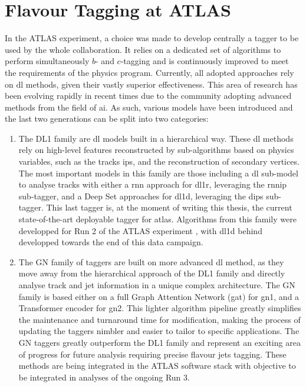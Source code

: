 \section{Flavour Tagging at ATLAS}
In the ATLAS experiment, a choice was made to develop centrally a tagger to be used by the whole collaboration. It relies on a dedicated set of algorithms to perform simultaneously $b$- and $c$-tagging and is continuously improved to meet the requirements of the physics program. Currently, all adopted approaches rely on \gls{dl} methods, given their vastly superior effectiveness. This area of research has been evolving rapidly in recent times due to the community adopting advanced methods from the field of \gls{ai}. As such, various models have been introduced and the last two generations can be split into two categories: 
\begin{enumerate}
  \item The DL1 family are \gls{dl} models built in a hierarchical way. These \gls{dl} methods rely on high-level features reconstructed by sub-algorithms based on physics variables, such as the tracks \glspl{ip}, and the reconstruction of secondary vertices. The most important models in this family are those including a \gls{dl} sub-model to analyse tracks with either a \gls{rnn} approach for \gls{dl1r}, leveraging the \gls{rnnip} sub-tagger, and a Deep Set approaches for \gls{dl1d}, leveraging the \gls{dips} sub-tagger. This last tagger is, at the moment of writing this thesis, the current state-of-the-art deployable tagger for \gls{atlas}. Algorithms from this family were developped for Run 2 of the ATLAS experiment \cite{atlas:FTAGRUN2}, with \gls{dl1d} behind developped towards the end of this data campaign.
  \item The GN family of taggers are built on more advanced \gls{dl} method, as they move away from the hierarchical approach of the DL1 family and directly analyse track and jet information in a unique complex architecture. The GN family is based either on a full Graph Attention Network (\gls{gat}) for \gls{gn1}, and a Transformer encoder for \gls{gn2}. This lighter algorithm pipeline greatly simplifies the maintenance and turnaround time for modification, making the process of updating the taggers nimbler and easier to tailor to specific applications. The GN taggers greatly outperform the DL1 family and represent an exciting area of progress for future analysis requiring precise flavour jets tagging. These methods are being integrated in the ATLAS software stack with objective to be integrated in analyses of the ongoing Run 3.  
\end{enumerate}

